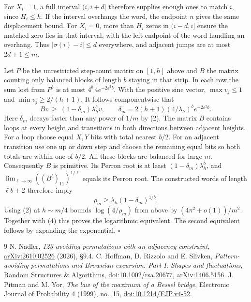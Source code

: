 \documentclass[11pt]{article}
\begin{document}
For $X_i=1$, a full interval $(i,i+d]$ therefore supplies enough ones to match $i$, since $H_i\le h$. If the interval overhangs the word, the endpoint $n$ gives the same displacement bound. For $X_i=0$, more than $H_i$ zeros in $(i-d,i]$ ensure the matched zero lies in that interval, with the left endpoint of the word handling an overhang. Thus $|\sigma(i)-i|\le d$ everywhere, and adjacent jumps are at most $2d+1\le m$.

Let $P$ be the unrestricted step-count matrix on $[1,h]$ above and $B$ the matrix counting only balanced blocks of length $b$ staying in that strip. In each row the sum lost from $P^b$ is at most $4^b\,4e^{-2\varepsilon^2b}$. With the positive sine vector, $\max v_j\le1$ and $\min v_j\ge 2/(h+1)$. It follows componentwise that
\[
 Bv\ \ge\ (1-\delta_m)\lambda_h^b v,\qquad
 \delta_m=2(h+1)(4/\lambda_h)^b e^{-2\varepsilon^2 b}.
\]
Here $\delta_m$ decays faster than any power of $1/m$ by (2). The matrix $B$ contains loops at every height and transitions in both directions between adjacent heights. For a loop choose equal $X,Y$ bits with total nearest $b/2$. For an adjacent transition use one up or down step and choose the remaining equal bits so both totals are within one of $b/2$. All these blocks are balanced for large $m$. Consequently $B$ is primitive. Its Perron root is at least $(1-\delta_m)\lambda_h^b$, and $\lim_{\ell\to\infty}((B^\ell)_{11})^{1/\ell}$ equals its Perron root. The constructed words of length $\ell b+2$ therefore imply
\[
 \rho_m\ge\lambda_h(1-\delta_m)^{1/b}.
\]
Using (2) at $h\sim m/4$ bounds $\log(4/\rho_m)$ from above by $(4\pi^2+o(1))/m^2$. Together with (4) this proves the logarithmic equivalent. The second equivalent follows by expanding the exponential. \hfill$\square$

\begin{thebibliography}{9}
 N. Nadler, \emph{123-avoiding permutations with an adjacency constraint}, \href{https://arxiv.org/abs/2610.02526}{arXiv:2610.02526} (2026), \S9.4.
 C. Hoffman, D. Rizzolo and E. Slivken, \emph{Pattern-avoiding permutations and Brownian excursion. Part I: Shapes and fluctuations}, Random Structures \& Algorithms, \href{https://doi.org/10.1002/rsa.20677}{doi:10.1002/rsa.20677}, \href{https://arxiv.org/abs/1406.5156}{arXiv:1406.5156}.
 J. Pitman and M. Yor, \emph{The law of the maximum of a Bessel bridge}, Electronic Journal of Probability 4 (1999), no.~15, \href{https://doi.org/10.1214/EJP.v4-52}{doi:10.1214/EJP.v4-52}.
\end{thebibliography}
\end{document}
